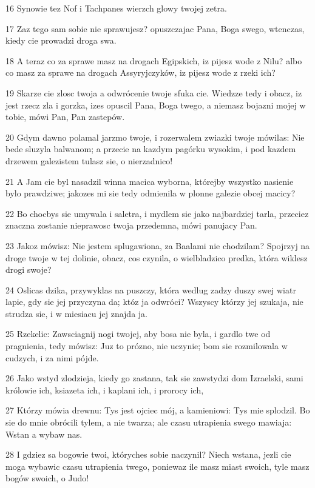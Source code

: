 \par 16 Synowie tez Nof i Tachpanes wierzch glowy twojej zetra.
\par 17 Zaz tego sam sobie nie sprawujesz? opuszczajac Pana, Boga swego, wtenczas, kiedy cie prowadzi droga swa.
\par 18 A teraz co za sprawe masz na drogach Egipskich, iz pijesz wode z Nilu? albo co masz za sprawe na drogach Assyryjczyków, iz pijesz wode z rzeki ich?
\par 19 Skarze cie zlosc twoja a odwrócenie twoje sfuka cie. Wiedzze tedy i obacz, iz jest rzecz zla i gorzka, izes opuscil Pana, Boga twego, a niemasz bojazni mojej w tobie, mówi Pan, Pan zastepów.
\par 20 Gdym dawno polamal jarzmo twoje, i rozerwalem zwiazki twoje mówilas: Nie bede sluzyla balwanom; a przecie na kazdym pagórku wysokim, i pod kazdem drzewem galezistem tulasz sie, o nierzadnico!
\par 21 A Jam cie byl nasadzil winna macica wyborna, którejby wszystko nasienie bylo prawdziwe; jakozes mi sie tedy odmienila w plonne galezie obcej macicy?
\par 22 Bo chocbys sie umywala i saletra, i mydlem sie jako najbardziej tarla, przeciez znaczna zostanie nieprawosc twoja przedemna, mówi panujacy Pan.
\par 23 Jakoz mówisz: Nie jestem splugawiona, za Baalami nie chodzilam? Spojrzyj na droge twoje w tej dolinie, obacz, cos czynila, o wielbladzico predka, która wiklesz drogi swoje?
\par 24 Oslicas dzika, przywyklas na puszczy, która wedlug zadzy duszy swej wiatr lapie, gdy sie jej przyczyna da; któz ja odwróci? Wszyscy którzy jej szukaja, nie strudza sie, i w miesiacu jej znajda ja.
\par 25 Rzekelic: Zawsciagnij nogi twojej, aby bosa nie byla, i gardlo twe od pragnienia, tedy mówisz: Juz to prózno, nie uczynie; bom sie rozmilowala w cudzych, i za nimi pójde.
\par 26 Jako wstyd zlodzieja, kiedy go zastana, tak sie zawstydzi dom Izraelski, sami królowie ich, ksiazeta ich, i kaplani ich, i prorocy ich,
\par 27 Którzy mówia drewnu: Tys jest ojciec mój, a kamieniowi: Tys mie splodzil. Bo sie do mnie obrócili tylem, a nie twarza; ale czasu utrapienia swego mawiaja: Wstan a wybaw nas.
\par 28 I gdziez sa bogowie twoi, któryches sobie naczynil? Niech wstana, jezli cie moga wybawic czasu utrapienia twego, poniewaz ile masz miast swoich, tyle masz bogów swoich, o Judo!
